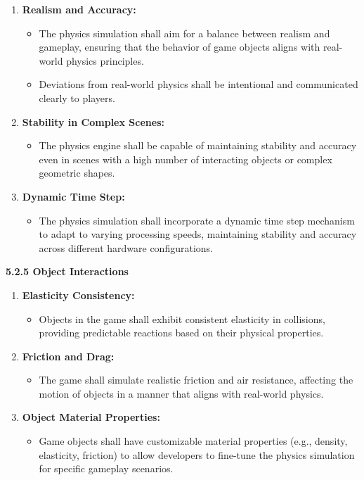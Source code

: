 \documentclass[
]{article}
\begin{document}
\begin{enumerate}
\def\labelenumi{\arabic{enumi}.}
\item
  \textbf{Realism and Accuracy:}

  \begin{itemize}
  \item
    The physics simulation shall aim for a balance between realism and
    gameplay, ensuring that the behavior of game objects aligns with
    real-world physics principles.
  \item
    Deviations from real-world physics shall be intentional and
    communicated clearly to players.
  \end{itemize}
\item
  \textbf{Stability in Complex Scenes:}

  \begin{itemize}
  \item
    The physics engine shall be capable of maintaining stability and
    accuracy even in scenes with a high number of interacting objects or
    complex geometric shapes.
  \end{itemize}
\item
  \textbf{Dynamic Time Step:}

  \begin{itemize}
  \item
    The physics simulation shall incorporate a dynamic time step
    mechanism to adapt to varying processing speeds, maintaining
    stability and accuracy across different hardware configurations.
  \end{itemize}
\end{enumerate}

\textbf{5.2.5 Object Interactions}

\begin{enumerate}
\def\labelenumi{\arabic{enumi}.}
\item
  \textbf{Elasticity Consistency:}

  \begin{itemize}
  \item
    Objects in the game shall exhibit consistent elasticity in
    collisions, providing predictable reactions based on their physical
    properties.
  \end{itemize}
\item
  \textbf{Friction and Drag:}

  \begin{itemize}
  \item
    The game shall simulate realistic friction and air resistance,
    affecting the motion of objects in a manner that aligns with
    real-world physics.
  \end{itemize}
\item
  \textbf{Object Material Properties:}

  \begin{itemize}
  \item
    Game objects shall have customizable material properties (e.g.,
    density, elasticity, friction) to allow developers to fine-tune the
    physics simulation for specific gameplay scenarios.
  \end{itemize}
\end{enumerate}
\end{document}
